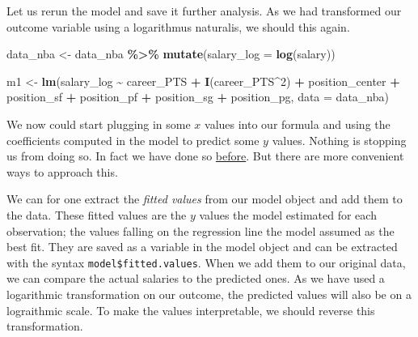 \documentclass[
]{book}
\newenvironment{Shaded}{\begin{snugshade}}{\end{snugshade}}
\newcommand{\AttributeTok}[1]{\textcolor[rgb]{0.13,0.29,0.53}{#1}}
\newcommand{\DecValTok}[1]{\textcolor[rgb]{0.00,0.00,0.81}{#1}}
\newcommand{\FunctionTok}[1]{\textcolor[rgb]{0.13,0.29,0.53}{\textbf{#1}}}
\newcommand{\NormalTok}[1]{#1}
\newcommand{\OtherTok}[1]{\textcolor[rgb]{0.56,0.35,0.01}{#1}}
\newcommand{\SpecialCharTok}[1]{\textcolor[rgb]{0.81,0.36,0.00}{\textbf{#1}}}
\begin{document}
Let us rerun the model and save it further analysis. As we had transformed our
outcome variable using a logarithmus naturalis, we should this again.

\begin{Shaded}
\begin{Highlighting}[]
\NormalTok{data\_nba }\OtherTok{\textless{}{-}}\NormalTok{ data\_nba }\SpecialCharTok{\%\textgreater{}\%} 
  \FunctionTok{mutate}\NormalTok{(}\AttributeTok{salary\_log =} \FunctionTok{log}\NormalTok{(salary))}

\NormalTok{m1 }\OtherTok{\textless{}{-}} \FunctionTok{lm}\NormalTok{(salary\_log }\SpecialCharTok{\textasciitilde{}}\NormalTok{ career\_PTS }\SpecialCharTok{+} \FunctionTok{I}\NormalTok{(career\_PTS}\SpecialCharTok{\^{}}\DecValTok{2}\NormalTok{) }\SpecialCharTok{+} 
\NormalTok{         position\_center }\SpecialCharTok{+}\NormalTok{ position\_sf }\SpecialCharTok{+}\NormalTok{ position\_pf }\SpecialCharTok{+}\NormalTok{ position\_sg }\SpecialCharTok{+}\NormalTok{ position\_pg,}
         \AttributeTok{data =}\NormalTok{ data\_nba)}
\end{Highlighting}
\end{Shaded}

We now could start plugging in some \(x\) values into our formula and using the
coefficients computed in the model to predict some \(y\) values. Nothing is
stopping us from doing so. In fact we have done so \protect\hyperlink{lin-a}{before}.
But there are more convenient ways to approach this.

We can for one extract the \emph{fitted values} from our model object and add them to
the data. These fitted values are the \(y\) values the model estimated for each
observation; the values falling on the regression line the model assumed as the
best fit. They are saved as a variable in the model object and can be extracted
with the syntax \texttt{model\$fitted.values}. When we add them to our original data,
we can compare the actual salaries to the predicted ones. As we have used a
logarithmic transformation on our outcome, the predicted values will also be on
a lograithmic scale. To make the values interpretable, we should reverse this
transformation.

\begin{Shaded}
\end{Shaded}
\end{document}
